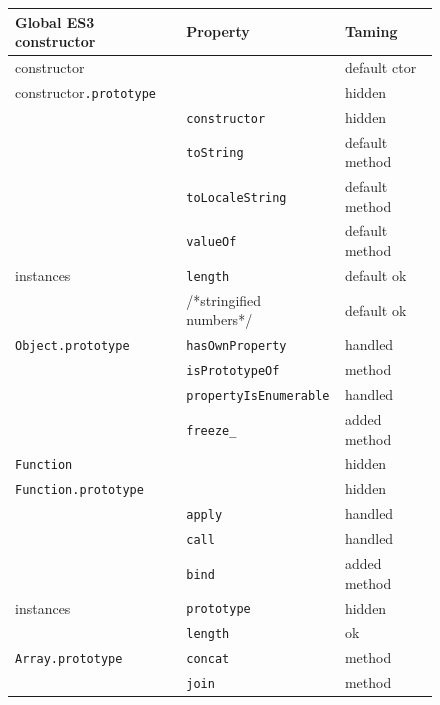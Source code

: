 \documentclass[letterpaper,twocolumn,10pt]{article}
\newcommand{\code}[1]{{\tt {#1}}}              %
\begin{document}
\begin{figure}
\begin{tabular}{lll}
  Global ES3 constructor       & Property                    & Taming \\
  \hline 
  constructor                  &                             & default ctor \\
  constructor\code{.prototype} &                             & hidden \\
                               & \code{constructor}          & hidden \\
                               & \code{toString}             & default method \\
                               & \code{toLocaleString}       & default method \\
                               & \code{valueOf}              & default method \\
  instances                    & \code{length}               & default ok \\
                               & /*stringified numbers*/     & default ok \\
  \hline
  \code{Object.prototype}      & \code{hasOwnProperty}       & handled \\
                               & \code{isPrototypeOf}        & method \\
                               & \code{propertyIsEnumerable} & handled \\
                               & \code{freeze\_}             & added method \\
  \hline
  \code{Function}              &                             & hidden \\
  \code{Function.prototype}    &                             & hidden \\
                               & \code{apply}                & handled \\
                               & \code{call}                 & handled \\
                               & \code{bind}                 & added method \\
  instances                    & \code{prototype}            & hidden \\
                               & \code{length}               & ok \\
  \hline
  \code{Array.prototype}       & \code{concat}               & method \\
                               & \code{join}                 & method \\

\end{tabular}
\end{figure}
\end{document}
